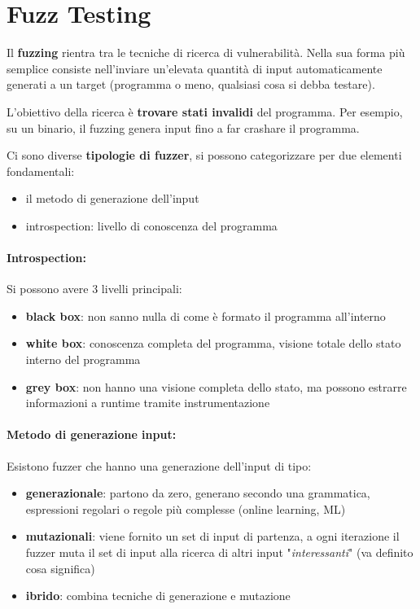 \section{Fuzz Testing}

Il \textbf{fuzzing} rientra tra le tecniche di ricerca di vulnerabilità. Nella sua forma più semplice consiste nell'inviare un'elevata quantità di input automaticamente generati a un target (programma o meno, qualsiasi cosa si debba testare). 

L'obiettivo della ricerca è \textbf{trovare stati invalidi} del programma. Per esempio, su un binario, il fuzzing genera input fino a far crashare il programma.

Ci sono diverse \textbf{tipologie di fuzzer}, si possono categorizzare per due elementi fondamentali: 
\begin{itemize}
	\item il metodo di generazione dell'input
    
	\item introspection: livello di conoscenza del programma
\end{itemize}

\paragraph{Introspection:} Si possono avere 3 livelli principali:
\begin{itemize}
	\item \textbf{black box}: non sanno nulla di come è formato il programma all'interno
	
    \item \textbf{white box}: conoscenza completa del programma, visione totale dello stato interno del programma
	
    \item \textbf{grey box}: non hanno una visione completa dello stato, ma possono estrarre informazioni a runtime tramite instrumentazione
\end{itemize}

\paragraph{Metodo di generazione input:} Esistono fuzzer che hanno una generazione dell'input di tipo: 
\begin{itemize}
	\item \textbf{generazionale}: partono da zero, generano secondo una grammatica, espressioni regolari o regole più complesse (online learning, ML)
	
    \item \textbf{mutazionali}: viene fornito un set di input di partenza, a ogni iterazione il fuzzer muta il set di input alla ricerca di altri input "\textit{interessanti}" (va definito cosa significa)
	
    \item \textbf{ibrido}: combina tecniche di generazione e mutazione
\end{itemize}

